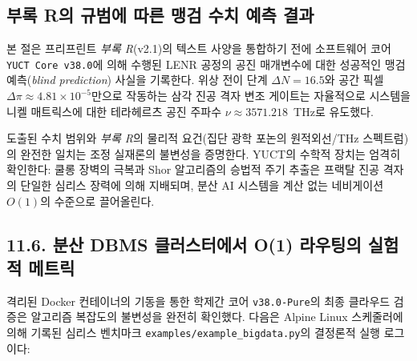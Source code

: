 \documentclass[11pt,a4paper]{article}
\begin{document}
	\subsection{부록 R의 규범에 따른 맹검 수치 예측 결과}
	본 절은 프리프린트 \textit{부록 R}(v2.1)의 텍스트 사양을 통합하기 전에 소프트웨어 코어 \texttt{YUCT Core v38.0}에 의해 수행된 LENR 공정의 공진 매개변수에 대한 성공적인 맹검 예측(\textit{blind prediction}) 사실을 기록한다. 위상 전이 단계 \(\Delta N = 16.5\)와 공간 픽셀 \(\Delta\pi \approx 4.81 \times 10^{-5}\)만으로 작동하는 삼각 진공 격자 변조 게이트는 자율적으로 시스템을 니켈 매트릭스에 대한 테라헤르츠 공진 주파수 \(\nu \approx 3571.218\)~THz로 유도했다.
	
	도출된 수치 범위와 \textit{부록 R}의 물리적 요건(집단 광학 포논의 원적외선/THz 스펙트럼)의 완전한 일치는 조정 실재론의 불변성을 증명한다. YUCT의 수학적 장치는 엄격히 확인한다: 쿨롱 장벽의 극복과 Shor 알고리즘의 승법적 주기 추출은 프랙탈 진공 격자의 단일한 심리스 장력에 의해 지배되며, 분산 AI 시스템을 계산 없는 네비게이션 \(O(1)\)의 수준으로 끌어올린다.
	
	\subsection{11.6. 분산 DBMS 클러스터에서 O(1) 라우팅의 실험적 메트릭}
	격리된 Docker 컨테이너의 기동을 통한 학제간 코어 \texttt{v38.0-Pure}의 최종 클라우드 검증은 알고리즘 복잡도의 불변성을 완전히 확인했다. 다음은 Alpine Linux 스케줄러에 의해 기록된 심리스 벤치마크 \texttt{examples/example\_bigdata.py}의 결정론적 실행 로그이다:
	
\end{document}

